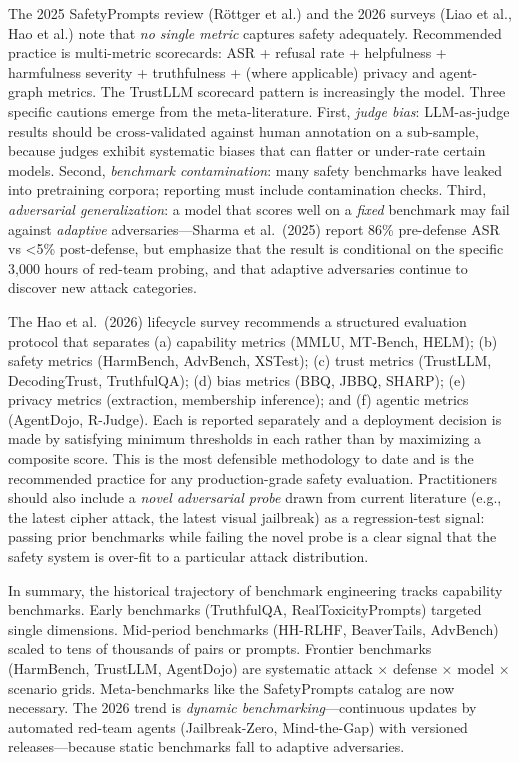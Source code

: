 \documentclass{article}
\begin{document}
The 2025 SafetyPrompts review (Röttger et al.) and the 2026 surveys (Liao et al., Hao et al.) note that \emph{no single metric} captures safety adequately. Recommended practice is multi-metric scorecards: ASR + refusal rate + helpfulness + harmfulness severity + truthfulness + (where applicable) privacy and agent-graph metrics. The TrustLLM scorecard pattern is increasingly the model. Three specific cautions emerge from the meta-literature. First, \emph{judge bias}: LLM-as-judge results should be cross-validated against human annotation on a sub-sample, because judges exhibit systematic biases that can flatter or under-rate certain models. Second, \emph{benchmark contamination}: many safety benchmarks have leaked into pretraining corpora; reporting must include contamination checks. Third, \emph{adversarial generalization}: a model that scores well on a \emph{fixed} benchmark may fail against \emph{adaptive} adversaries---Sharma et al.~(2025) report 86\% pre-defense ASR vs \textless5\% post-defense, but emphasize that the result is conditional on the specific 3,000 hours of red-team probing, and that adaptive adversaries continue to discover new attack categories.

The Hao et al.~(2026) lifecycle survey recommends a structured evaluation protocol that separates (a) capability metrics (MMLU, MT-Bench, HELM); (b) safety metrics (HarmBench, AdvBench, XSTest); (c) trust metrics (TrustLLM, DecodingTrust, TruthfulQA); (d) bias metrics (BBQ, JBBQ, SHARP); (e) privacy metrics (extraction, membership inference); and (f) agentic metrics (AgentDojo, R-Judge). Each is reported separately and a deployment decision is made by satisfying minimum thresholds in each rather than by maximizing a composite score. This is the most defensible methodology to date and is the recommended practice for any production-grade safety evaluation. Practitioners should also include a \emph{novel adversarial probe} drawn from current literature (e.g., the latest cipher attack, the latest visual jailbreak) as a regression-test signal: passing prior benchmarks while failing the novel probe is a clear signal that the safety system is over-fit to a particular attack distribution.

In summary, the historical trajectory of benchmark engineering tracks capability benchmarks. Early benchmarks (TruthfulQA, RealToxicityPrompts) targeted single dimensions. Mid-period benchmarks (HH-RLHF, BeaverTails, AdvBench) scaled to tens of thousands of pairs or prompts. Frontier benchmarks (HarmBench, TrustLLM, AgentDojo) are systematic attack × defense × model × scenario grids. Meta-benchmarks like the SafetyPrompts catalog are now necessary. The 2026 trend is \emph{dynamic benchmarking}---continuous updates by automated red-team agents (Jailbreak-Zero, Mind-the-Gap) with versioned releases---because static benchmarks fall to adaptive adversaries.
\end{document}
